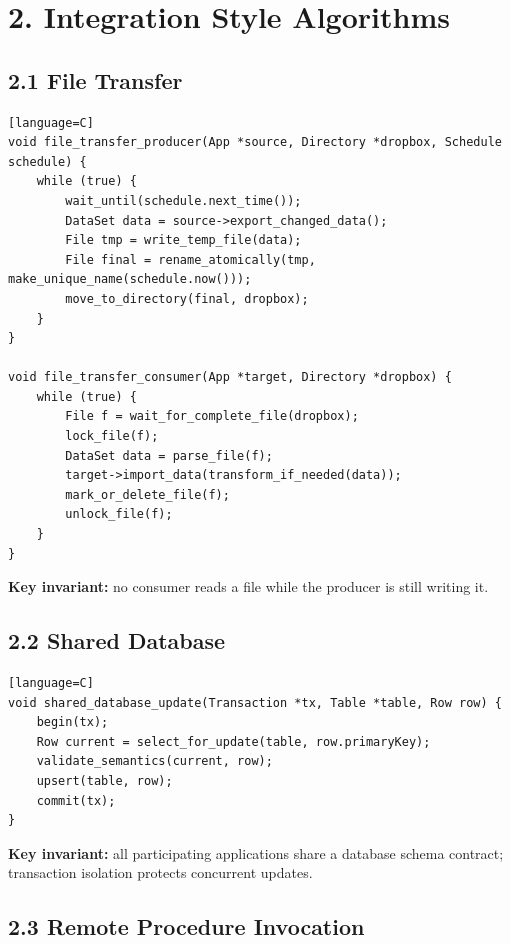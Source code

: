 \documentclass[11pt]{article}
\begin{document}
\section{2. Integration Style
Algorithms}\label{integration-style-algorithms}

\subsection{2.1 File Transfer}\label{file-transfer}

\begin{verbatim}[language=C]
void file_transfer_producer(App *source, Directory *dropbox, Schedule schedule) {
    while (true) {
        wait_until(schedule.next_time());
        DataSet data = source->export_changed_data();
        File tmp = write_temp_file(data);
        File final = rename_atomically(tmp, make_unique_name(schedule.now()));
        move_to_directory(final, dropbox);
    }
}

void file_transfer_consumer(App *target, Directory *dropbox) {
    while (true) {
        File f = wait_for_complete_file(dropbox);
        lock_file(f);
        DataSet data = parse_file(f);
        target->import_data(transform_if_needed(data));
        mark_or_delete_file(f);
        unlock_file(f);
    }
}
\end{verbatim}

\textbf{Key invariant:} no consumer reads a file while the producer is
still writing it.

\subsection{2.2 Shared Database}\label{shared-database}

\begin{verbatim}[language=C]
void shared_database_update(Transaction *tx, Table *table, Row row) {
    begin(tx);
    Row current = select_for_update(table, row.primaryKey);
    validate_semantics(current, row);
    upsert(table, row);
    commit(tx);
}
\end{verbatim}

\textbf{Key invariant:} all participating applications share a database
schema contract; transaction isolation protects concurrent updates.

\subsection{2.3 Remote Procedure
Invocation}\label{remote-procedure-invocation}
\end{document}
